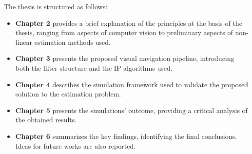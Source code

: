 %
%
%
%
%
The thesis is structured as follows:
\begin{itemize}
    \item \textbf{Chapter 2} provides a brief explanation of the principles at the basis of the thesis, ranging from aspects of computer vision to preliminary aspects of non-linear estimation methods used. 
    \item \textbf{Chapter 3} presents the proposed visual navigation pipeline, introducing both the filter structure and the IP algorithms used.
    \item \textbf{Chapter 4} describes the simulation framework used to validate the proposed solution to the estimation problem.
    \item \textbf{Chapter 5} presents the simulations' outcome, providing a critical analysis of the obtained results.
    \item \textbf{Chapter 6} summarizes the key findings, identifying the final conclusions. Ideas for future works are also reported.
\end{itemize}

